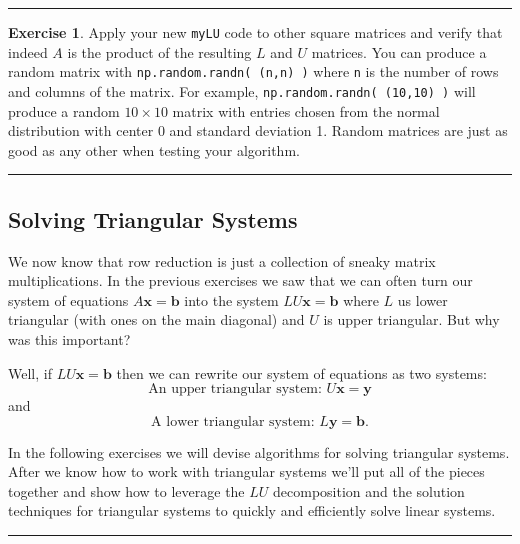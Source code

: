 \documentclass[
]{book}
\theoremstyle{definition}
\theoremstyle{definition}
\theoremstyle{definition}
\newtheorem{exercise}{Exercise}[chapter]
\theoremstyle{remark}
\begin{document}
\begin{center}\rule{0.5\linewidth}{0.5pt}\end{center}

\begin{exercise}
\protect\hypertarget{exr:unnamed-chunk-322}{}{\label{exr:unnamed-chunk-322} }Apply your new \texttt{myLU} code to other square matrices and verify that indeed \(A\) is the product of the resulting \(L\) and \(U\) matrices. You can produce a random matrix with \texttt{np.random.randn(\ (n,n)\ )} where \texttt{n} is the number of rows and columns of the matrix. For example, \texttt{np.random.randn(\ (10,10)\ )} will produce a random \(10 \times 10\) matrix with entries chosen from the normal distribution with center 0 and standard deviation 1. Random matrices are just as good as any other when testing your algorithm.
\end{exercise}

\begin{center}\rule{0.5\linewidth}{0.5pt}\end{center}

\hypertarget{solving-triangular-systems}{%
\subsection{Solving Triangular Systems}\label{solving-triangular-systems}}

We now know that row reduction is just a collection of sneaky matrix multiplications. In the previous exercises we saw that we can often turn our system of equations \(A \boldsymbol{x} = \boldsymbol{b}\) into the system \(LU \boldsymbol{x} = \boldsymbol{b}\) where \(L\) us lower triangular (with ones on the main diagonal) and \(U\) is upper triangular. But why was this important?

Well, if \(LU \boldsymbol{x} = \boldsymbol{b}\) then we can rewrite our system of equations as two systems:
\[ \text{An upper triangular system: } U \boldsymbol{x} = \boldsymbol{y} \]
and
\[ \text{A lower triangular system: } L \boldsymbol{y} = \boldsymbol{b}. \]

In the following exercises we will devise algorithms for solving triangular systems. After we know how to work with triangular systems we'll put all of the pieces together and show how to leverage the \(LU\) decomposition and the solution techniques for triangular systems to quickly and efficiently solve linear systems.

\begin{center}\rule{0.5\linewidth}{0.5pt}\end{center}
\end{document}
